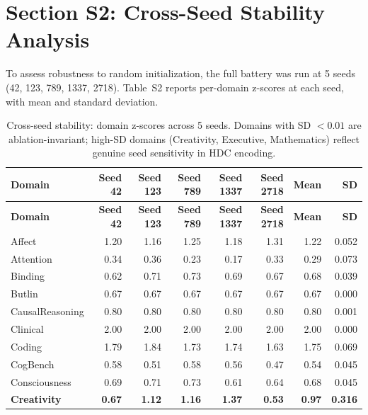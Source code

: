 \documentclass[10pt,landscape]{article}
\begin{document}

\newpage
\section*{Section S2: Cross-Seed Stability Analysis}

To assess robustness to random initialization, the full battery was run at 5 seeds (42, 123, 789, 1337, 2718). Table~S2 reports per-domain z-scores at each seed, with mean and standard deviation.

\begin{longtable}{@{}lrrrrrrr@{}}
\caption{Cross-seed stability: domain z-scores across 5 seeds. Domains with SD $< 0.01$ are ablation-invariant; high-SD domains (Creativity, Executive, Mathematics) reflect genuine seed sensitivity in HDC encoding.} \label{tab:s2} \\
\toprule
\textbf{Domain} & \textbf{Seed 42} & \textbf{Seed 123} & \textbf{Seed 789} & \textbf{Seed 1337} & \textbf{Seed 2718} & \textbf{Mean} & \textbf{SD} \\
\midrule
\endfirsthead
\toprule
\textbf{Domain} & \textbf{Seed 42} & \textbf{Seed 123} & \textbf{Seed 789} & \textbf{Seed 1337} & \textbf{Seed 2718} & \textbf{Mean} & \textbf{SD} \\
\midrule
\endhead
\bottomrule
\endlastfoot
Affect & 1.20 & 1.16 & 1.25 & 1.18 & 1.31 & 1.22 & 0.052 \\
Attention & 0.34 & 0.36 & 0.23 & 0.17 & 0.33 & 0.29 & 0.073 \\
Binding & 0.62 & 0.71 & 0.73 & 0.69 & 0.67 & 0.68 & 0.039 \\
Butlin & 0.67 & 0.67 & 0.67 & 0.67 & 0.67 & 0.67 & 0.000 \\
CausalReasoning & 0.80 & 0.80 & 0.80 & 0.80 & 0.80 & 0.80 & 0.001 \\
Clinical & 2.00 & 2.00 & 2.00 & 2.00 & 2.00 & 2.00 & 0.000 \\
Coding & 1.79 & 1.84 & 1.73 & 1.74 & 1.63 & 1.75 & 0.069 \\
CogBench & 0.58 & 0.51 & 0.58 & 0.56 & 0.47 & 0.54 & 0.045 \\
Consciousness & 0.69 & 0.71 & 0.73 & 0.61 & 0.64 & 0.68 & 0.045 \\
\textbf{Creativity} & \textbf{0.67} & \textbf{1.12} & \textbf{1.16} & \textbf{1.37} & \textbf{0.53} & \textbf{0.97} & \textbf{0.316} \\

\end{longtable}
\end{document}
